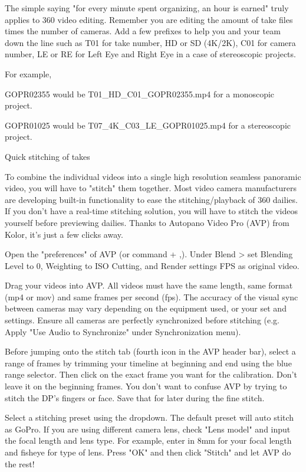 \begin{fullwidth}
The simple saying "for every minute spent organizing, an hour is earned" truly applies to 360 video editing. Remember you are editing the amount of take files times the number of cameras. Add a few prefixes to help you and your team down the line such as T01 for take number, HD or SD (4K/2K), C01 for camera number, LE or RE for Left Eye and Right Eye in a case of stereoscopic projects.

For example,

GOPR02355 would be T01\_HD\_C01\_GOPR02355.mp4 for a monoscopic project.

GOPR01025 would be T07\_4K\_C03\_LE\_GOPR01025.mp4 for a stereoscopic project.

{\large Quick stitching of takes \par}

To combine the individual videos into a single high resolution seamless panoramic video, you will have to "stitch" them together. Most video camera manufacturers are developing built-in functionality to ease the stitching/playback of 360 dailies. If you don't have a real-time stitching solution, you will have to stitch the videos yourself before previewing dailies. Thanks to Autopano Video Pro (AVP) from Kolor, it's just a few clicks away.

Open the "preferences" of AVP (or command + ,). Under Blend > set Blending Level to 0, Weighting to ISO Cutting, and Render settings FPS as original video.

Drag your videos into AVP. All videos must have the same length, same format (mp4 or mov) and same frames per second (fps). The accuracy of the visual sync between cameras may vary depending on the equipment used, or your set and settings. Ensure all cameras are perfectly synchronized before stitching (e.g. Apply "Use Audio to Synchronize" under Synchronization menu).

Before jumping onto the stitch tab (fourth icon in the AVP header bar), select a range of frames by trimming your timeline at beginning and end using the blue range selector. Then click on the exact frame you want for the calibration. Don't leave it on the beginning frames. You don't want to confuse AVP by trying to stitch the DP's fingers or face. Save that for later during the fine stitch. 

Select a stitching preset using the dropdown. The default preset will auto stitch as GoPro. If you are using different camera lens, check "Lens model" and input the focal length and lens type. For example, enter in 8mm for your focal length and fisheye for type of lens. Press "OK" and then click "Stitch" and let AVP do the rest!


\end{fullwidth}
